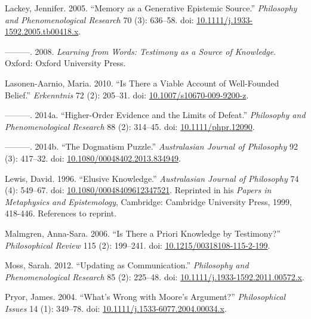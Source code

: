 \documentclass[
  10pt,
  letterpaper,
  DIV=11,
  numbers=noendperiod,
  twoside]{scrartcl}
\newlength{\cslhangindent}
\newenvironment{CSLReferences}[2] %
 {\begin{list}{}{%
  \setlength{\itemindent}{0pt}
  \setlength{\leftmargin}{0pt}
  \setlength{\parsep}{0pt}
  \ifodd #1
   \setlength{\leftmargin}{\cslhangindent}
   \setlength{\itemindent}{-1\cslhangindent}
  \fi
  \setlength{\itemsep}{#2\baselineskip}}}
 {\end{list}}
\begin{document}
\begin{CSLReferences}{1}{0}
Lackey, Jennifer. 2005. {``Memory as a Generative Epistemic Source.''}
\emph{Philosophy and Phenomenological Research} 70 (3): 636--58. doi:
\href{https://doi.org/10.1111/j.1933-1592.2005.tb00418.x}{10.1111/j.1933-1592.2005.tb00418.x}.

---------. 2008. \emph{Learning from Words: Testimony as a Source of
Knowledge}. Oxford: Oxford University Press.

Lasonen-Aarnio, Maria. 2010. {``Is There a Viable Account of
Well-Founded Belief.''} \emph{Erkenntnis} 72 (2): 205--31. doi:
\href{https://doi.org/10.1007/s10670-009-9200-z}{10.1007/s10670-009-9200-z}.

---------. 2014a. {``Higher-Order Evidence and the Limits of Defeat.''}
\emph{Philosophy and Phenomenological Research} 88 (2): 314--45. doi:
\href{https://doi.org/10.1111/phpr.12090}{10.1111/phpr.12090}.

---------. 2014b. {``The Dogmatism Puzzle.''} \emph{Australasian Journal
of Philosophy} 92 (3): 417--32. doi:
\href{https://doi.org/10.1080/00048402.2013.834949}{10.1080/00048402.2013.834949}.

Lewis, David. 1996. {``Elusive Knowledge.''} \emph{Australasian Journal
of Philosophy} 74 (4): 549--67. doi:
\href{https://doi.org/10.1080/00048409612347521}{10.1080/00048409612347521}.
Reprinted in his \emph{Papers in Metaphysics and Epistemology},
Cambridge: Cambridge University Press, 1999, 418-446. References to
reprint.

Malmgren, Anna-Sara. 2006. {``Is There a Priori Knowledge by
Testimony?''} \emph{Philosophical Review} 115 (2): 199--241. doi:
\href{https://doi.org/10.1215/00318108-115-2-199}{10.1215/00318108-115-2-199}.

Moss, Sarah. 2012. {``Updating as Communication.''} \emph{Philosophy and
Phenomenological Research} 85 (2): 225--48. doi:
\href{https://doi.org/10.1111/j.1933-1592.2011.00572.x}{10.1111/j.1933-1592.2011.00572.x}.

Pryor, James. 2004. {``What's Wrong with Moore's Argument?''}
\emph{Philosophical Issues} 14 (1): 349--78. doi:
\href{https://doi.org/10.1111/j.1533-6077.2004.00034.x}{10.1111/j.1533-6077.2004.00034.x}.


\end{CSLReferences}
\end{document}
